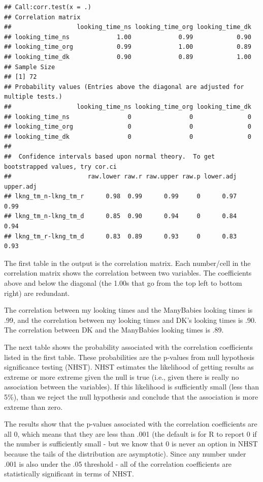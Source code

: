 \documentclass[
]{book}
\begin{document}
\begin{verbatim}
## Call:corr.test(x = .)
## Correlation matrix 
##                  looking_time_ns looking_time_org looking_time_dk
## looking_time_ns             1.00             0.99            0.90
## looking_time_org            0.99             1.00            0.89
## looking_time_dk             0.90             0.89            1.00
## Sample Size 
## [1] 72
## Probability values (Entries above the diagonal are adjusted for multiple tests.) 
##                  looking_time_ns looking_time_org looking_time_dk
## looking_time_ns                0                0               0
## looking_time_org               0                0               0
## looking_time_dk                0                0               0
## 
##  Confidence intervals based upon normal theory.  To get bootstrapped values, try cor.ci
##                     raw.lower raw.r raw.upper raw.p lower.adj upper.adj
## lkng_tm_n-lkng_tm_r      0.98  0.99      0.99     0      0.97      0.99
## lkng_tm_n-lkng_tm_d      0.85  0.90      0.94     0      0.84      0.94
## lkng_tm_r-lkng_tm_d      0.83  0.89      0.93     0      0.83      0.93
\end{verbatim}

The first table in the output is the correlation matrix. Each number/cell in the correlation matrix shows the correlation between two variables. The coefficients above and below the diagonal (the 1.00s that go from the top left to bottom right) are redundant.

The correlation between my looking times and the ManyBabies looking times is .99, and the correlation between my looking times and DK's looking times is .90. The correlation between DK and the ManyBabies looking times is .89.

The next table shows the probability associated with the correlation coefficients listed in the first table. These probabilities are the p-values from null hypothesis significance testing (NHST). NHST estimates the likelihood of getting results as extreme or more extreme given the null is true (i.e., given there is really no association between the variables). If this likelihood is sufficiently small (less than 5\%), than we reject the null hypothesis and conclude that the association is more extreme than zero.

The results show that the p-values associated with the correlation coefficients are all 0, which means that they are less than .001 (the default is for R to report 0 if the number is sufficiently small - but we know that 0 is never an option in NHST because the tails of the distribution are asymptotic). Since any number under .001 is also under the .05 threshold - all of the correlation coefficients are statistically significant in terms of NHST.
\end{document}
